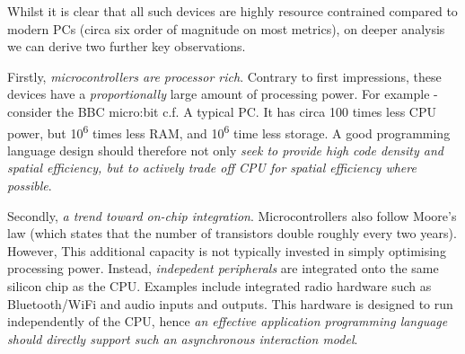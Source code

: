 Whilst it is clear that all such devices are highly resource contrained compared to modern PCs 
(circa six order of magnitude on most metrics), on deeper analysis we can derive two further key observations.

Firstly, \emph{microcontrollers are processor rich}. Contrary to first impressions, these devices have 
a \emph{proportionally} large amount of processing power. For example - consider the BBC micro:bit 
c.f. A typical PC. It has circa 100 times less CPU power, but 10\textsuperscript{6} times less RAM, and 10\textsuperscript{6} time less storage. 
A good programming language design should therefore not only \emph{seek to provide high code density and spatial efficiency, 
but to actively trade off CPU for spatial efficiency where possible}. 

Secondly, \emph{a trend toward on-chip integration}. Microcontrollers also follow Moore's law (which states 
that the number of transistors double roughly every two years). However, This additional capacity is 
not typically invested in simply optimising processing power. Instead, \emph{indepedent peripherals} 
are integrated onto the same silicon chip as the CPU. Examples include integrated radio hardware such 
as Bluetooth/WiFi and audio inputs and outputs. This hardware is designed to run independently of the 
CPU, hence \emph{an effective application programming language should directly support such an asynchronous
interaction model}.


